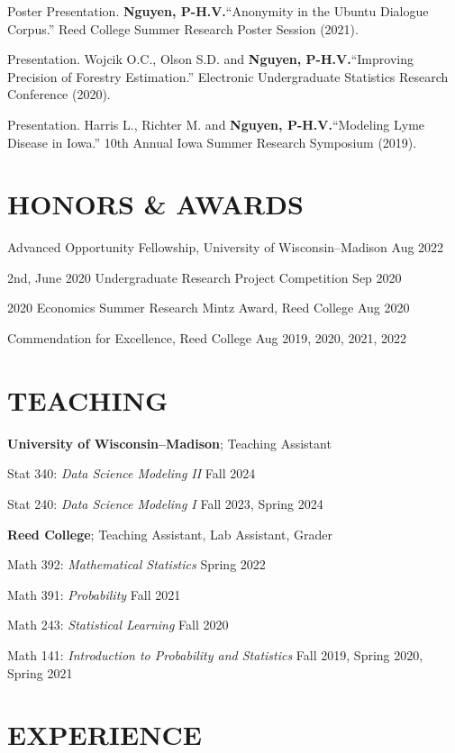 \documentclass[margin]{res}
\def\pvn{\textbf{Nguyen, P-H.V.}}
\begin{document}
\begin{resume}
Poster Presentation. \pvn ``Anonymity in the Ubuntu Dialogue Corpus.” Reed College Summer Research Poster Session (2021).

Presentation. Wojcik O.C., Olson S.D. and \pvn ``Improving Precision of Forestry Estimation.” Electronic Undergraduate Statistics Research Conference (2020).

Presentation. Harris L., Richter M. and \pvn ``Modeling Lyme Disease in Iowa.” 10th Annual Iowa Summer Research Symposium (2019).


\section{HONORS \& AWARDS} 

Advanced Opportunity Fellowship, University of Wisconsin--Madison \hfill Aug 2022

2nd, June 2020 Undergraduate Research Project Competition \hfill Sep 2020

2020 Economics Summer Research Mintz Award, Reed College \hfill Aug 2020

Commendation for Excellence, Reed College \hfill Aug 2019, 2020, 2021, 2022

\section{TEACHING}

\textbf{University of Wisconsin--Madison}; Teaching Assistant

Stat 340: {\it Data Science Modeling II} \hfill Fall 2024

Stat 240: {\it Data Science Modeling I} \hfill Fall 2023, Spring 2024

\textbf{Reed College}; Teaching Assistant, Lab Assistant, Grader 

Math 392: {\it Mathematical Statistics} \hfill Spring 2022

Math 391: {\it Probability} \hfill Fall 2021

Math 243: {\it Statistical Learning} \hfill Fall 2020

Math 141: {\it Introduction to Probability and Statistics} \hfill Fall 2019, Spring 2020, Spring 2021


\section{EXPERIENCE}


\end{resume}
\end{document}
